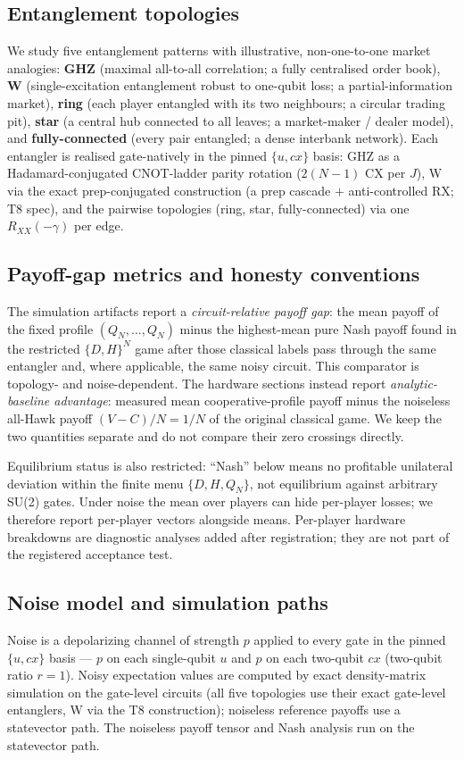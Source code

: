 \documentclass[conference]{IEEEtran}
\begin{document}
\subsection{Entanglement topologies}
We study five entanglement patterns with illustrative, non-one-to-one market
analogies: \textbf{GHZ} (maximal all-to-all correlation; a fully centralised
order book), \textbf{W} (single-excitation entanglement robust to one-qubit loss;
a partial-information market), \textbf{ring} (each player entangled with its
two neighbours; a circular trading pit), \textbf{star} (a central hub
connected to all leaves; a market-maker / dealer model), and
\textbf{fully-connected} (every pair entangled; a dense interbank network).
Each entangler is realised gate-natively in the pinned $\{u,cx\}$ basis:
GHZ as a Hadamard-conjugated CNOT-ladder parity rotation ($2(N{-}1)$ CX per
$J$), W via the exact prep-conjugated construction (a prep cascade $+$
anti-controlled $\mathrm{RX}$; T8 spec), and the pairwise topologies (ring,
star, fully-connected) via one $R_{XX}(-\gamma)$ per edge.

\subsection{Payoff-gap metrics and honesty conventions}
The simulation artifacts report a \emph{circuit-relative payoff gap}: the mean
payoff of the fixed profile $(Q_N,\dots,Q_N)$ minus the highest-mean pure
Nash payoff found in the restricted $\{D,H\}^N$ game after those classical
labels pass through the same entangler and, where applicable, the same noisy
circuit. This comparator is topology- and noise-dependent. The hardware
sections instead report \emph{analytic-baseline advantage}: measured mean
cooperative-profile payoff minus the noiseless all-Hawk payoff
$(V-C)/N=1/N$ of the original classical game. We keep the two quantities
separate and do not compare their zero crossings directly.

Equilibrium status is also restricted: ``Nash'' below means no profitable
unilateral deviation within the finite menu $\{D,H,Q_N\}$, not equilibrium
against arbitrary SU(2) gates. Under noise the mean over players can hide
per-player losses; we therefore report per-player vectors alongside means.
Per-player hardware breakdowns are diagnostic analyses added after
registration; they are not part of the registered acceptance test.

\subsection{Noise model and simulation paths}
Noise is a depolarizing channel of strength $p$ applied to every gate in the
pinned $\{u,cx\}$ basis --- $p$ on each single-qubit $u$ and $p$ on each
two-qubit $cx$ (two-qubit ratio $r{=}1$). Noisy expectation values are
computed by exact density-matrix simulation on the gate-level circuits (all
five topologies use their exact gate-level entanglers, W via the T8
construction); noiseless reference payoffs use a statevector path. The
noiseless payoff tensor and Nash analysis run on the statevector path.
\end{document}
